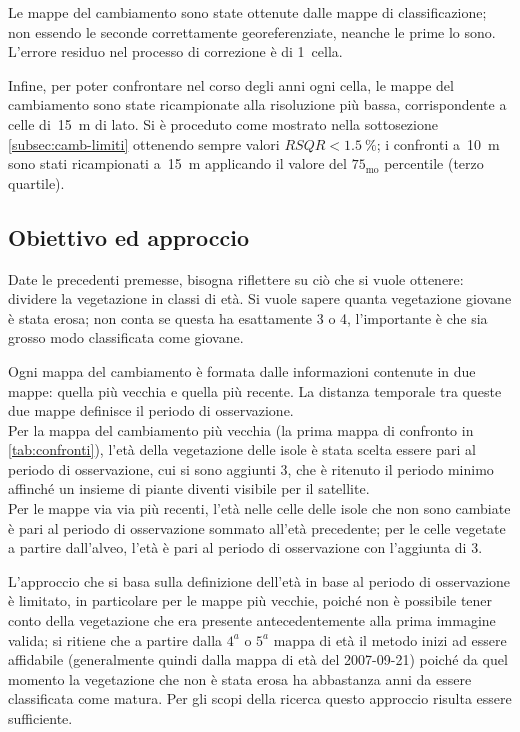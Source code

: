 Le mappe del cambiamento sono state ottenute dalle mappe di classificazione; non essendo le seconde correttamente georeferenziate, neanche le prime lo sono. L'errore residuo nel processo di correzione è di 1~cella.

Infine, per poter confrontare nel corso degli anni ogni cella, le mappe del cambiamento sono state ricampionate alla risoluzione più bassa, corrispondente a celle di~\SI{15}{\m} di lato. Si è proceduto come mostrato nella sottosezione \ref{subsec:camb-limiti} ottenendo sempre valori $RSQR < \SI{1.5}{\percent}$; i confronti a~\SI{10}{\m} sono stati ricampionati a~\SI{15}{\m} applicando il valore del $75_\mathrm{mo}$ percentile (terzo quartile).


\subsection{Obiettivo ed approccio} 
Date le precedenti premesse, bisogna riflettere su ciò che si vuole ottenere: dividere la vegetazione in classi di età.
Si vuole sapere quanta vegetazione giovane è stata erosa; non conta se questa ha esattamente \SI{3}{\anni} o \SI{4}{\anni}, l'importante è che sia grosso modo classificata come giovane.

Ogni mappa del cambiamento è formata dalle informazioni contenute in due mappe: quella più vecchia e quella più recente. La distanza temporale tra queste due mappe definisce il periodo di osservazione.
\\
Per la mappa del cambiamento più vecchia (la prima mappa di confronto in \cref{tab:confronti}), l'età della vegetazione delle isole è stata scelta essere pari al periodo di osservazione, cui si sono aggiunti \SI{3}{\anni}, che è ritenuto il periodo minimo affinché un insieme di piante diventi visibile per il satellite.
\\
Per le mappe via via più recenti, l'età nelle celle delle isole che non sono cambiate è pari al periodo di osservazione sommato all'età precedente; per le celle vegetate a partire dall'alveo, l'età è pari al periodo di osservazione con l'aggiunta di \SI{3}{\anni}.

L'approccio che si basa sulla definizione dell'età in base al periodo di osservazione è limitato, in particolare per le mappe più vecchie, poiché non è possibile tener conto della vegetazione che era presente antecedentemente alla prima immagine valida;
si ritiene che a partire dalla $4^a$ o $5^a$ mappa di età il metodo inizi ad essere affidabile (generalmente quindi dalla mappa di età del 2007-09-21) poiché da quel momento la vegetazione che non è stata erosa ha abbastanza anni da essere classificata come matura.
Per gli scopi della ricerca questo approccio risulta essere sufficiente.

